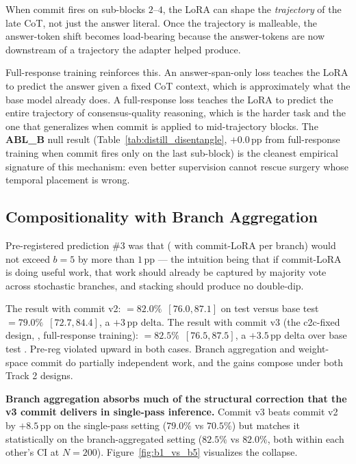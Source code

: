 When commit fires on sub-blocks $2$--$4$, the LoRA can shape the
\emph{trajectory} of the late CoT, not just the answer literal.
Once the trajectory is malleable, the answer-token shift becomes
load-bearing because the answer-tokens are now downstream of a
trajectory the adapter helped produce.

Full-response training reinforces this.  An answer-span-only loss
teaches the LoRA to predict the answer given a fixed CoT context,
which is approximately what the base model already does.  A
full-response loss teaches the LoRA to predict the entire
trajectory of consensus-quality reasoning, which is the harder
task and the one that generalizes when commit is applied to
mid-trajectory blocks.  The \textbf{ABL\_B} null result
(Table~\ref{tab:distill_disentangle}, $+0.0$\,pp from full-response
training when commit fires only on the last sub-block) is the
cleanest empirical signature of this mechanism: even better
supervision cannot rescue surgery whose temporal placement is
wrong.

\subsection{Compositionality with Branch Aggregation}
\label{subsec:distill_compose}

Pre-registered prediction \#3 was that \cmajc{} (\cmaj{} with
commit-LoRA per branch) would not exceed \cmaj{} $b{=}5$ by more
than $1$\,pp --- the intuition being that if commit-LoRA is doing
useful work, that work should already be captured by majority vote
across stochastic branches, and stacking should produce no
double-dip.

The result with commit v2: \cmajc{} $= 82.0\%$~\mbox{$[76.0, 87.1]$}
on test versus base test \cmaj{} $= 79.0\%$~\mbox{$[72.7, 84.4]$},
a $+3$\,pp delta.  The result with commit v3 (the c2c-fixed
design, , full-response training):
\cmajc{} $= 82.5\%$~\mbox{$[76.5, 87.5]$}, a $+3.5$\,pp delta over
base test \cmaj{}.  Pre-reg violated upward in both cases.  Branch
aggregation and weight-space commit do partially independent work,
and the gains compose under both Track 2 designs.

\textbf{Branch aggregation absorbs much of the structural
correction that the v3 commit delivers in single-pass inference.}
Commit v3 beats commit v2 by $+8.5$\,pp on the single-pass
\ctwoc{} setting ($79.0\%$ vs $70.5\%$) but matches it
statistically on the branch-aggregated \cmajc{} setting ($82.5\%$
vs $82.0\%$, both within each other's CI at $N{=}200$).
Figure~\ref{fig:b1_vs_b5} visualizes the collapse.

